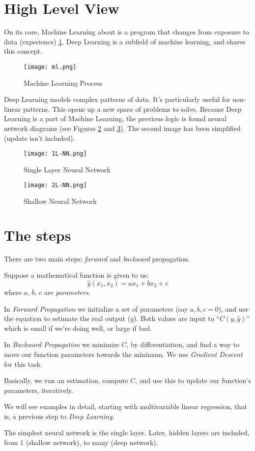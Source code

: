 \section{High Level View}

On its core, Machine Learning about is a program that changes from exposure to data (experience) \ref{fig:learn}. Deep Learning is a subfield of machine learning, and shares this concept.

\begin{figure}[h]
 \centering
 \texttt{[image: ml.png]}
  \caption{Machine Learning Process}\label{fig:learn}
\end{figure}

Deep Learning models complex patterns of data. It's particularly useful for non-linear patterns. This opens up a new space of problems to solve. Because Deep Learning is a part of Machine Learning, the previous logic is found neural network diagrams (see Figures \ref{fig:single} and \ref{fig:shallow}). The second image has been simplified (update isn't included).


\begin{figure}
 \centering
 \texttt{[image: 1L-NN.png]}
 \caption{Single Layer Neural Network}
 \label{fig:single}
\end{figure}


\begin{figure}
 \centering
 \texttt{[image: 2L-NN.png]}
 \caption{Shallow Neural Network}
 \label{fig:shallow}
\end{figure}

\section{The steps}
There are two main steps: \textit{forward} and \textit{backward} propagation. 

Suppose a mathematical function is given to us:
$$ \hat{y}(x_1,x_2) = a x_1 + b x_2 + c$$
where $a$, $b$, $c$ are \textit{parameters}.

In \textit{Forward Propagation} we initialize a set of parameters (say $a,b,c=0$), and use the equation to estimate the real output ($y$). Both values are input to ``$C(y, \hat{y})$'' which is small if we're doing well, or large if bad.

In \textit{Backward Propagation} we minimize $C$, by differentiation, and find a way to move our function parameters towards the minimum. We use \textit{Gradient Descent} for this task.

Basically, we run an estimation, compute $C$, and use this to update our function's parameters, iteratively.

We will see examples in detail, starting with multivariable linear regression, that is, a previous step to \textit{Deep Learning}.

The simplest neural network is the single layer. Later, hidden layers are included, from 1 (shallow network), to many (deep network).

